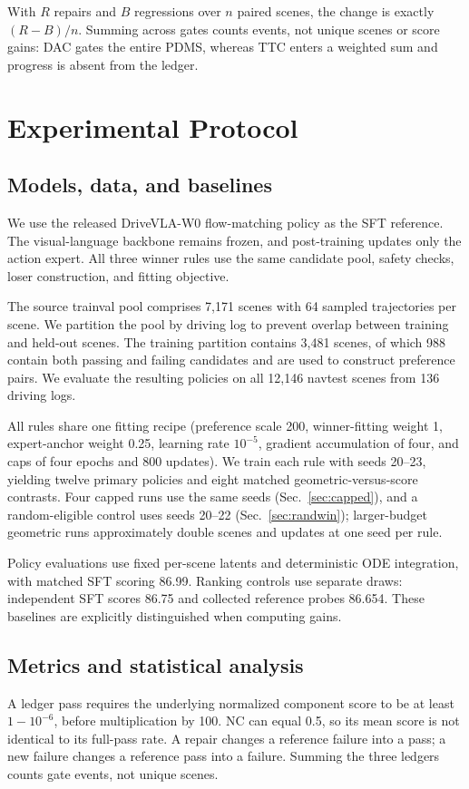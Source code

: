 \documentclass[letterpaper,10pt,conference]{ieeeconf}
\begin{document}
With $R$ repairs and $B$ regressions over $n$ paired scenes, the change is exactly $(R-B)/n$. Summing across gates counts events, not unique scenes or score gains: DAC gates the entire PDMS, whereas TTC enters a weighted sum and progress is absent from the ledger.

\section{Experimental Protocol}
\subsection{Models, data, and baselines}

We use the released DriveVLA-W0 flow-matching policy as the SFT reference. The visual-language backbone remains frozen, and post-training updates only the action expert. All three winner rules use the same candidate pool, safety checks, loser construction, and fitting objective.

The source trainval pool comprises 7,171 scenes with 64 sampled trajectories per scene. We partition the pool by driving log to prevent overlap between training and held-out scenes. The training partition contains 3,481 scenes, of which 988 contain both passing and failing candidates and are used to construct preference pairs. We evaluate the resulting policies on all 12,146 navtest scenes from 136 driving logs.


All rules share one fitting recipe (preference scale 200, winner-fitting weight 1, expert-anchor weight 0.25, learning rate $10^{-5}$, gradient accumulation of four, and caps of four epochs and 800 updates). We train each rule with seeds 20--23, yielding twelve primary policies and eight matched geometric-versus-score contrasts. Four capped runs use the same seeds (Sec.~\ref{sec:capped}), and a random-eligible control uses seeds 20--22 (Sec.~\ref{sec:randwin}); larger-budget geometric runs approximately double scenes and updates at one seed per rule.

Policy evaluations use fixed per-scene latents and deterministic ODE integration, with matched SFT scoring 86.99. Ranking controls use separate draws: independent SFT scores 86.75 and collected reference probes 86.654. These baselines are explicitly distinguished when computing gains.

\subsection{Metrics and statistical analysis}
A ledger pass requires the underlying normalized component score to be at least $1-10^{-6}$, before multiplication by 100. NC can equal 0.5, so its mean score is not identical to its full-pass rate. A repair changes a reference failure into a pass; a new failure changes a reference pass into a failure. Summing the three ledgers counts gate events, not unique scenes.
\end{document}
